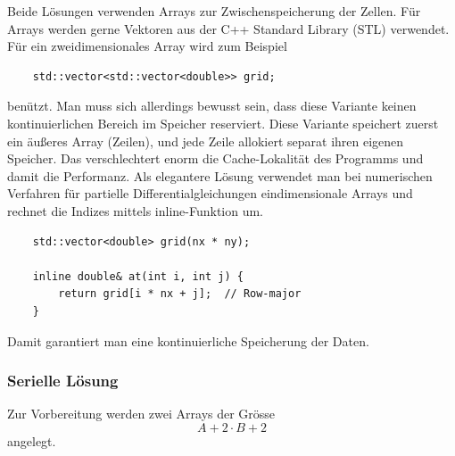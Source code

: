 Beide Lösungen verwenden Arrays zur Zwischenspeicherung der Zellen.
Für Arrays werden gerne Vektoren aus der C++ Standard Library (STL) verwendet.
Für ein zweidimensionales Array wird zum Beispiel
\begin{lstlisting}
	std::vector<std::vector<double>> grid;
\end{lstlisting}
benützt.
Man muss sich allerdings bewusst sein, dass diese Variante keinen kontinuierlichen Bereich im Speicher reserviert.
Diese Variante speichert zuerst ein äußeres Array (Zeilen), und jede Zeile allokiert separat ihren eigenen Speicher.
Das verschlechtert enorm die Cache-Lokalität des Programms und damit die Performanz.
Als elegantere Lösung verwendet man bei numerischen Verfahren für partielle Differentialgleichungen eindimensionale Arrays und rechnet die Indizes mittels inline-Funktion um.
\begin{lstlisting}
	std::vector<double> grid(nx * ny);
	
	inline double& at(int i, int j) {
		return grid[i * nx + j];  // Row-major
	}
\end{lstlisting}
Damit garantiert man eine kontinuierliche Speicherung der Daten.

\subsubsection{Serielle Lösung}
\label{parallelisierung:sub:serLoesung}
Zur Vorbereitung werden zwei Arrays der Grösse 
\begin{equation}
A+2 \cdot B+2 
\end{equation}
angelegt. 

